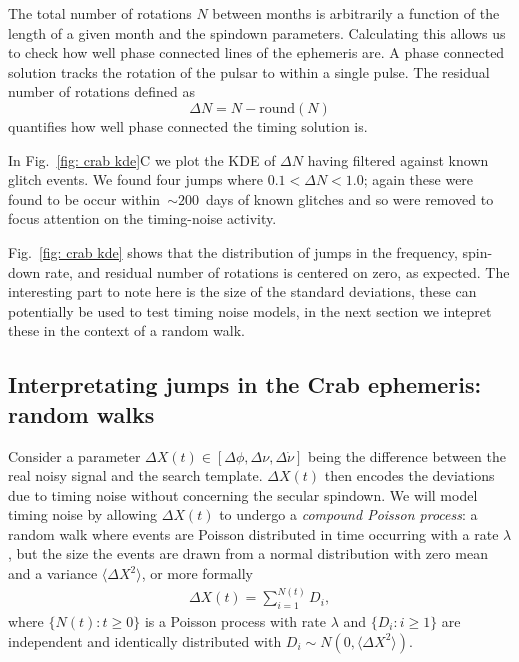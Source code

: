 \documentclass[../full_thesis/full_thesis.tex]{subfiles}
\begin{document}
\begin{subappendices}
The total number of rotations $N$ between months is arbitrarily a function of
the length of a given month and the spindown parameters. Calculating this
allows us to check how well phase connected lines of the ephemeris are. A phase
connected solution tracks the rotation of the pulsar to within a single pulse.
The residual number of rotations defined as
\begin{equation}
\Delta N = N - \textrm{round}(N)
\end{equation}
quantifies how well phase connected the timing solution is.

In Fig.~\ref{fig: crab kde}C we plot the KDE of $\Delta N$ having filtered
against known glitch events. We found four jumps where $0.1 < \Delta N < 1.0$;
again these were found to be occur within~$\sim200$~days of known glitches and
so were removed to focus attention on the timing-noise activity.

Fig.~\ref{fig: crab kde} shows that the distribution of jumps in the frequency,
spin-down rate, and residual number of rotations is centered on zero, as
expected. The interesting part to note here is the size of the standard deviations,
these can potentially be used to test timing noise models, in the next section
we intepret these in the context of a random walk.

\subsection{Interpretating jumps in the Crab ephemeris: random walks}
\label{sec: physical interpretation of the monthly ephemeris}

Consider a parameter $\Delta X(t) \in [\Delta\phi, \Delta\nu,\Delta\dot{\nu}]$ being
the difference between the real noisy signal and the search template. $\Delta
X(t)$ then encodes the deviations due to timing noise without concerning the
secular spindown.  We will model timing noise by allowing $\Delta X(t)$ to
undergo a \emph{compound Poisson process}: a random walk where events are
Poisson distributed in time occurring with a rate $\lambda$, but the size the
events are drawn from a normal distribution with zero mean and a variance
$\langle \Delta X^{2} \rangle$, or more formally
\begin{align}
\Delta X(t) = \sum_{i=1}^{N(t)} D_i,
\end{align}
where $\{ N(t): t \ge 0\}$ is a Poisson process with rate $\lambda$ and
$\{D_i: i \ge 1\}$ are independent and identically distributed with 
$D_i \sim N(0, \langle\Delta X^{2}\rangle)$.


\end{subappendices}
\end{document}
